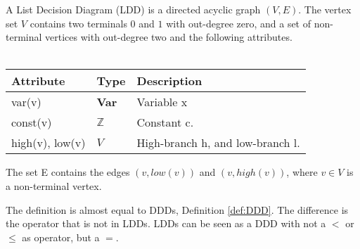 \begin{mydef}
\label{def:LDD}
A List Decision Diagram (LDD) is a directed acyclic graph $(V,E)$. The vertex set $V$ contains two terminals $0$ and $1$ with out-degree zero, and a set of non-terminal vertices with out-degree two and the following attributes.
\\\\
\begin{tabular}{lll}
Attribute                & Type                      & Description                                           \\\hline
var(v)                   & \textbf{Var}              & Variable x \\

const(v)                 & $\mathbb{Z}$              & Constant c.                                           \\
high(v), low(v)          & $V$                       & High-branch h, and low-branch l.                   
\end{tabular}
The set E contains the edges $(v,low(v))$ and $(v, high(v))$, where $v \in V$ is a non-terminal vertex.
\end{mydef} 

The definition is almost equal to DDDs, Definition \ref{def:DDD}. The difference is the operator that is not in LDDs. LDDs can be seen as a DDD with not a $<$ or $\leq$ as operator, but a $=$. 
